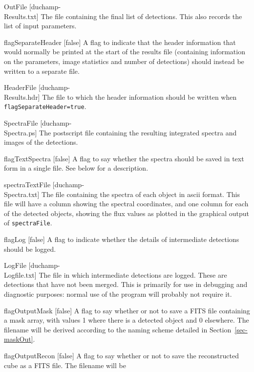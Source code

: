 \begin{Lentry}
\item[{OutFile [duchamp-\\Results.txt]}] The file containing the
  final list of detections. This also records the list of input
  parameters.
\item[{flagSeparateHeader [false]}] A flag to indicate that the header
  information that would normally be printed at the start of the
  results file (containing information on the parameters, image
  statistics and number of detections) should instead be written to a
  separate file.
\item[{HeaderFile [duchamp-\\Results.hdr]}] The file to which the
  header information should be written when
  \texttt{flagSeparateHeader=true}.
\item[{SpectraFile [duchamp-\\Spectra.ps]}] The postscript file
  containing the resulting integrated spectra and images of the
  detections.
\item[{flagTextSpectra [false]}] A flag to say whether the spectra
  should be saved in text form in a single file. See below for a
  description. 
\item[{spectraTextFile [duchamp-\\Spectra.txt]}] The file containing
  the spectra of each object in ascii format. This file will have a
  column showing the spectral coordinates, and one column for each of
  the detected objects, showing the flux values as plotted in the
  graphical output of \texttt{spectraFile}.
\item[{flagLog [false]}] A flag to indicate whether the
  details of intermediate detections should be logged.
\item[{LogFile [duchamp-\\Logfile.txt]}] The file in which
  intermediate detections are logged. These are detections that have
  not been merged. This is primarily for use in debugging and
  diagnostic purposes: normal use of the program will probably not
  require it.
\item[{flagOutputMask [false]}] A flag to say whether or not to save a
  FITS file containing a mask array, with values 1 where there is a
  detected object and 0 elsewhere. The filename will be derived
  according to the naming scheme detailed in Section~\ref{sec-maskOut}.
\item[{flagOutputRecon [false]}] A flag to say whether or not
  to save the reconstructed cube as a FITS file. The filename will be

\end{Lentry}
